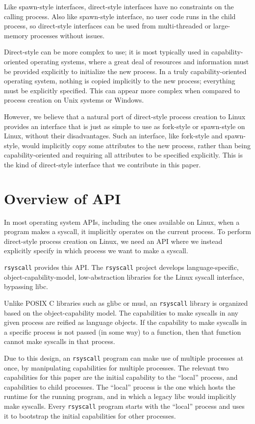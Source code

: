 \documentclass[letterpaper,twocolumn,10pt]{article}
\begin{document}
Like spawn-style interfaces,
direct-style interfaces have no constraints on the calling process.
Also like spawn-style interface,
no user code runs in the child process, so
direct-style interfaces can be used from multi-threaded or large-memory processes without issues.

Direct-style can be more complex to use;
it is most typically used in capability-oriented operating systems,
where a great deal of resources and information must be provided explicitly to initialize the new process.
In a truly capability-oriented operating system,
nothing is copied implicitly to the new process;
everything must be explicitly specified.
This can appear more complex
when compared to process creation on Unix systems or Windows.

However, we believe that a natural port of direct-style process creation to Linux
provides an interface that is just as simple to use as fork-style or spawn-style on Linux,
without their disadvantages.
Such an interface, like fork-style and spawn-style,
would implicitly copy some attributes to the new process,
rather than being capability-oriented and requiring all attributes to be specified explicitly.
This is the kind of direct-style interface that we contribute in this paper.
\section{Overview of API}\label{overview}
In most operating system APIs, including the ones available on Linux,
when a program makes a syscall, it implicitly operates on the current process.
To perform direct-style process creation on Linux,
we need an API where we instead explicitly specify in which process we want to make a syscall.

\texttt{rsyscall} provides this API.
The \texttt{rsyscall} project develops
language-specific, object-capability-model, low-abstraction libraries for the Linux syscall interface,
bypassing libc.

Unlike POSIX C libraries such as glibc or musl,
an \texttt{rsyscall} library is organized based on the object-capability model.
The capabilities to make syscalls in any given process are reified as language objects.
If the capability to make syscalls in a specific process is not passed (in some way) to a function,
then that function cannot make syscalls in that process.

Due to this design, an \texttt{rsyscall} program can make use of multiple processes at once,
by manipulating capabilities for multiple processes.
The relevant two capabilities for this paper are the initial capability to the ``local'' process,
and capabilities to child processes.
The ``local'' process is the one which hosts the runtime for the running program,
and in which a legacy libc would implicitly make syscalls.
Every \texttt{rsyscall} program starts with the ``local'' process
and uses it to bootstrap the initial capabilities for other processes.
\end{document}
